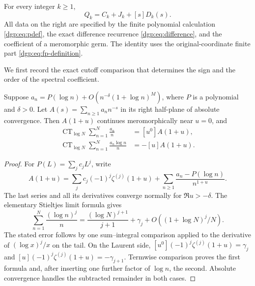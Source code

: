 \begin{theorem}
\label{dgp:thm:all-power}
For every integer $k\ge1$,
\begin{equation}
                 \boxed{\;Q_k=C_k+J_k+[s]D_k(s).\;}
 \label{dgp:eq:all-power}
\end{equation}
All data on the right are specified by the finite polynomial
calculation \eqref{dgp:eq:pdef}, the exact difference recurrence
\eqref{dgp:eq:difference}, and the coefficient of a meromorphic germ.
The identity uses the original-coordinate finite part
\eqref{dgp:eq:fp-definition}.
\end{theorem}

We first record the exact cutoff comparison that determines the sign
and the order of the spectral coefficient.

\begin{lemma}
\label{dgp:lem:cutoff}
Suppose
$a_n=P(\log n)+O(n^{-\delta}(1+\log n)^M)$, where $P$ is a
polynomial and $\delta>0$.  Let $A(s)=\sum_{n\ge1}a_nn^{-s}$
in its right half-plane of absolute convergence.  Then $A(1+u)$
continues meromorphically near $u=0$, and
\begin{align}
 \operatorname{CT}_{\log N}\sum_{n=1}^N\frac{a_n}{n}
           &=[u^0]A(1+u), \label{dgp:eq:cutoff-zero}\\
 \operatorname{CT}_{\log N}\sum_{n=1}^N\frac{a_n\log n}{n}
           &=-[u]A(1+u). \label{dgp:eq:cutoff-one}
\end{align}
\end{lemma}

\begin{proof}
For $P(L)=\sum_j c_jL^j$, write
\[
 A(1+u)=\sum_j c_j(-1)^j\zeta^{(j)}(1+u)
           +\sum_{n\ge1}\frac{a_n-P(\log n)}{n^{1+u}}.
\]
The last series and all its derivatives converge normally for
$\Re u>-\delta$.  The elementary Stieltjes limit formula gives
\[
 \sum_{n=1}^N\frac{(\log n)^j}{n}
       =\frac{(\log N)^{j+1}}{j+1}+\gamma_j
                    +O((1+\log N)^j/N).
\]
The stated error follows by one sum--integral comparison applied
to the derivative of $(\log x)^j/x$ on the tail.
On the Laurent side,
$[u^0](-1)^j\zeta^{(j)}(1+u)=\gamma_j$ and
$[u](-1)^j\zeta^{(j)}(1+u)=-\gamma_{j+1}$.
Termwise comparison proves the first formula and, after inserting
one further factor of $\log n$, the second.  Absolute convergence
handles the subtracted remainder in both cases.
\end{proof}

